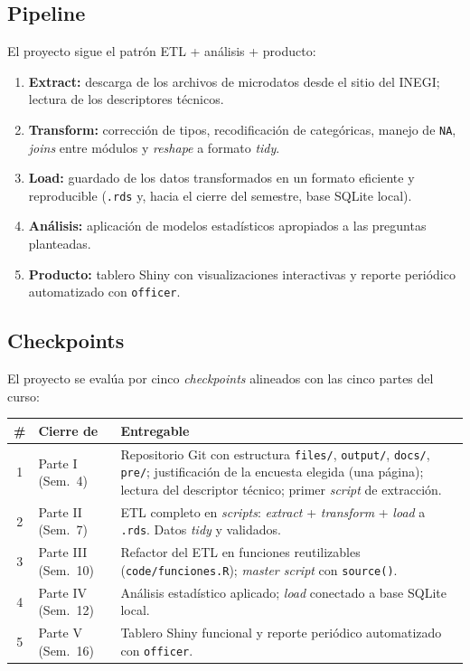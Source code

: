 \documentclass[11pt,letterpaper]{article}
\begin{document}
\subsection*{Pipeline}

El proyecto sigue el patrón ETL + análisis + producto:

\begin{enumerate}[leftmargin=*, itemsep=1pt]
    \item \textbf{Extract:} descarga de los archivos de microdatos desde el sitio del INEGI; lectura de los descriptores técnicos.
    \item \textbf{Transform:} corrección de tipos, recodificación de categóricas, manejo de \texttt{NA}, \textit{joins} entre módulos y \textit{reshape} a formato \textit{tidy}.
    \item \textbf{Load:} guardado de los datos transformados en un formato eficiente y reproducible (\texttt{.rds} y, hacia el cierre del semestre, base SQLite local).
    \item \textbf{Análisis:} aplicación de modelos estadísticos apropiados a las preguntas planteadas.
    \item \textbf{Producto:} tablero Shiny con visualizaciones interactivas y reporte periódico automatizado con \texttt{officer}.
\end{enumerate}

\subsection*{Checkpoints}

El proyecto se evalúa por cinco \textit{checkpoints} alineados con las cinco partes del curso:

\begin{center}
\begin{tabular}{cp{2.6cm}p{9cm}}
\toprule
\textbf{\#} & \textbf{Cierre de} & \textbf{Entregable} \\
\midrule
1 & Parte I (Sem.\ 4)   & Repositorio Git con estructura \texttt{files/}, \texttt{output/}, \texttt{docs/}, \texttt{pre/}; justificación de la encuesta elegida (una página); lectura del descriptor técnico; primer \textit{script} de extracción. \\
2 & Parte II (Sem.\ 7)  & ETL completo en \textit{scripts}: \textit{extract} + \textit{transform} + \textit{load} a \texttt{.rds}. Datos \textit{tidy} y validados. \\
3 & Parte III (Sem.\ 10) & Refactor del ETL en funciones reutilizables (\texttt{code/funciones.R}); \textit{master script} con \texttt{source()}. \\
4 & Parte IV (Sem.\ 12) & Análisis estadístico aplicado; \textit{load} conectado a base SQLite local. \\
5 & Parte V (Sem.\ 16) & Tablero Shiny funcional y reporte periódico automatizado con \texttt{officer}. \\
\bottomrule
\end{tabular}
\end{center}
\end{document}
